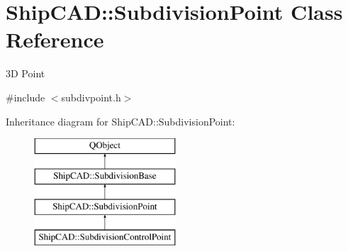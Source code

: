 \hypertarget{classShipCAD_1_1SubdivisionPoint}{\section{Ship\-C\-A\-D\-:\-:Subdivision\-Point Class Reference}
\label{classShipCAD_1_1SubdivisionPoint}
}


3\-D Point  




{\ttfamily \#include $<$subdivpoint.\-h$>$}

Inheritance diagram for Ship\-C\-A\-D\-:\-:Subdivision\-Point\-:\begin{figure}[H]
\begin{center}
\leavevmode
\includegraphics[height=4.000000cm]{classShipCAD_1_1SubdivisionPoint}
\end{center}
\end{figure}
